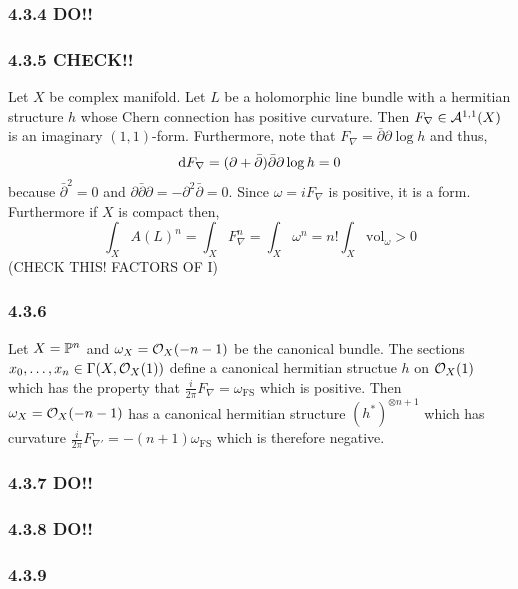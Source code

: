 \documentclass[12pt]{article}
\begin{document}
\subsubsection{4.3.4 DO!!}

\subsubsection{4.3.5 CHECK!!}

Let $X$ be complex manifold. Let $L$ be a holomorphic line bundle with a hermitian structure $h$ whose Chern connection has positive curvature. Then $F_\nabla \in \A^{1,1}(X)$ is an imaginary $(1,1)$-form. Furthermore, note that $F_\nabla = \bar{\partial} \partial \log{h}$ and thus,
\[ \d{F_\nabla} = (\partial + \bar{\partial}) \bar{\partial} \partial \log{h} = 0 \]
because $\bar{\partial}^2 = 0$ and $\partial \bar{\partial} \partial = - \partial^2 \bar{\partial} = 0$. Since $\omega = i F_\nabla$ is positive, it is a \kahler form. Furthermore if $X$ is compact then,
\[ \int_X A(L)^n = \int_X F_\nabla^n = \int_X \omega^n = n! \int_X \mathrm{vol}_\omega > 0 \]
(CHECK THIS! FACTORS OF I)

\subsubsection{4.3.6}

Let $X = \P^n$ and $\omega_X = \struct{X}(-n-1)$ be the canonical bundle. The sections $x_0, \dots, x_n \in \Gamma(X, \struct{X}(1))$ define a canonical hermitian structue $h$ on $\struct{X}(1)$ which has the property that $\frac{i}{2 \pi} F_\nabla = \omega_{\mathrm{FS}}$ which is positive. Then $\omega_X = \struct{X}(-n-1)$ has a canonical hermitian structure $(h^*)^{\otimes n + 1}$ which has curvature $\frac{i}{2 \pi} F_{\nabla'} = - (n + 1) \omega_{\mathrm{FS}}$ which is therefore negative. 

\subsubsection{4.3.7 DO!!}

\subsubsection{4.3.8 DO!!}

\subsubsection{4.3.9}
\end{document}
